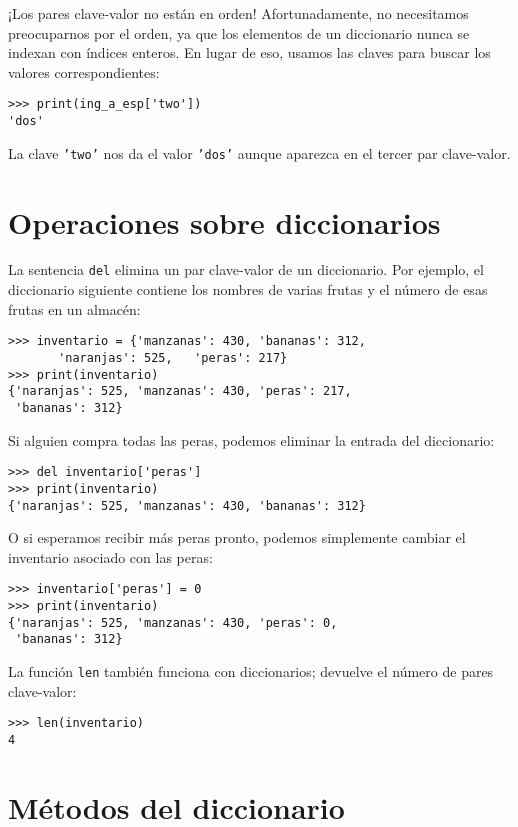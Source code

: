 ¡Los pares clave-valor no están en orden! Afortunadamente, no necesitamos
preocuparnos por el orden, ya que los elementos de un diccionario
nunca se indexan con índices enteros. En lugar de eso, usamos las
claves para buscar los valores correspondientes:
\begin{lstlisting}
>>> print(ing_a_esp['two'])
'dos'
\end{lstlisting}

La clave \texttt{'two'} nos da el valor \texttt{'dos'} aunque aparezca
en el tercer par clave-valor.

\section{Operaciones sobre diccionarios}

 

La sentencia \texttt{del} elimina un par clave-valor de un diccionario.
Por ejemplo, el diccionario siguiente contiene los nombres de varias
frutas y el número de esas frutas en un almacén:
\begin{lstlisting}
>>> inventario = {'manzanas': 430, 'bananas': 312, 
       'naranjas': 525,   'peras': 217}
>>> print(inventario)
{'naranjas': 525, 'manzanas': 430, 'peras': 217, 
 'bananas': 312}
\end{lstlisting}
 Si alguien compra todas las peras, podemos eliminar la entrada del
diccionario:
\begin{lstlisting}
>>> del inventario['peras']
>>> print(inventario)
{'naranjas': 525, 'manzanas': 430, 'bananas': 312}
\end{lstlisting}

O si esperamos recibir más peras pronto, podemos simplemente cambiar
el inventario asociado con las peras:
\begin{lstlisting}
>>> inventario['peras'] = 0
>>> print(inventario)
{'naranjas': 525, 'manzanas': 430, 'peras': 0, 
 'bananas': 312}
\end{lstlisting}
 La función \texttt{len} también funciona con diccionarios; devuelve
el número de pares clave-valor:
\begin{lstlisting}
>>> len(inventario)
4
\end{lstlisting}

\section{Métodos del diccionario}

